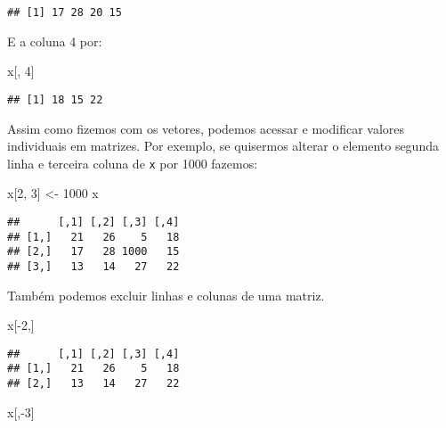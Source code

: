 \documentclass[
]{book}
\newenvironment{Shaded}{\begin{snugshade}}{\end{snugshade}}
\newcommand{\DecValTok}[1]{\textcolor[rgb]{0.00,0.00,0.81}{#1}}
\newcommand{\NormalTok}[1]{#1}
\newcommand{\OtherTok}[1]{\textcolor[rgb]{0.56,0.35,0.01}{#1}}
\newcommand{\SpecialCharTok}[1]{\textcolor[rgb]{0.00,0.00,0.00}{#1}}
\begin{document}
\begin{verbatim}
## [1] 17 28 20 15
\end{verbatim}

E a coluna 4 por:

\begin{Shaded}
\begin{Highlighting}[]
\NormalTok{x[, }\DecValTok{4}\NormalTok{]}
\end{Highlighting}
\end{Shaded}

\begin{verbatim}
## [1] 18 15 22
\end{verbatim}

Assim como fizemos com os vetores, podemos acessar e modificar valores individuais em matrizes. Por exemplo, se quisermos alterar o elemento segunda linha e terceira coluna de \texttt{x} por 1000 fazemos:

\begin{Shaded}
\begin{Highlighting}[]
\NormalTok{x[}\DecValTok{2}\NormalTok{, }\DecValTok{3}\NormalTok{] }\OtherTok{\textless{}{-}} \DecValTok{1000}
\NormalTok{x}
\end{Highlighting}
\end{Shaded}

\begin{verbatim}
##      [,1] [,2] [,3] [,4]
## [1,]   21   26    5   18
## [2,]   17   28 1000   15
## [3,]   13   14   27   22
\end{verbatim}

Também podemos excluir linhas e colunas de uma matriz.

\begin{Shaded}
\begin{Highlighting}[]
\NormalTok{x[}\SpecialCharTok{{-}}\DecValTok{2}\NormalTok{,]}
\end{Highlighting}
\end{Shaded}

\begin{verbatim}
##      [,1] [,2] [,3] [,4]
## [1,]   21   26    5   18
## [2,]   13   14   27   22
\end{verbatim}

\begin{Shaded}
\begin{Highlighting}[]
\NormalTok{x[,}\SpecialCharTok{{-}}\DecValTok{3}\NormalTok{]}
\end{Highlighting}
\end{Shaded}
\end{document}
